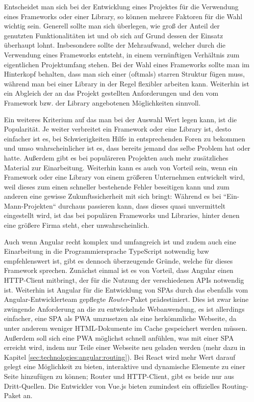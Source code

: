 Entscheidet man sich bei der Entwicklung eines Projektes für die Verwendung eines Frameworks oder einer Library, so können mehrere Faktoren für die Wahl wichtig sein. Generell sollte man sich überlegen, wie groß der Anteil der genutzten Funktionalitäten ist und ob sich auf Grund dessen der Einsatz überhaupt lohnt. Insbesondere sollte der Mehraufwand, welcher durch die Verwendung eines Frameworks entsteht, in einem vernünftigen Verhältnis zum eigentlichen Projektumfang stehen. Bei der Wahl eines Frameworks sollte man im Hinterkopf behalten, dass man sich einer (oftmals) starren Struktur fügen muss, während man bei einer Library in der Regel flexibler arbeiten kann. Weiterhin ist ein Abgleich der an das Projekt gestellten Anforderungen und den vom Framework bzw. der Library angebotenen Möglichkeiten sinnvoll.

Ein weiteres Kriterium auf das man bei der Auswahl Wert legen kann, ist die Popularität. Je weiter verbreitet ein Framework oder eine Library ist, desto einfacher ist es, bei Schwierigkeiten Hilfe in entsprechenden Foren zu bekommen und umso wahrscheinlicher ist es, dass bereits jemand das selbe Problem hat oder hatte. Außerdem gibt es bei populäreren Projekten auch mehr zusätzliches Material zur Einarbeitung. Weiterhin kann es auch von Vorteil sein, wenn ein Framework oder eine Library von einem größeren Unternehmen entwickelt wird, weil dieses zum einen schneller bestehende Fehler beseitigen kann und zum anderen eine gewisse Zukunftssicherheit mit sich bringt: Während es bei ``Ein-Mann-Projekten`` durchaus passieren kann, dass dieses quasi unvermittelt eingestellt wird, ist das bei populären Frameworks und Libraries, hinter denen eine größere Firma steht, eher unwahrscheinlich.

Auch wenn Angular recht komplex und umfangreich ist und zudem auch eine Einarbeitung in die Programmiersprache TypeScript notwendig bzw empfehlenswert ist, gibt es dennoch überzeugende Gründe, welche für dieses Framework sprechen. Zunächst einmal ist es von Vorteil, dass Angular einen \acs{HTTP}-Client mitbringt, der für die Nutzung der verschiedenen \acsp{API} notwendig ist. Weiterhin ist Angular für die Entwicklung von \acsp{SPA} durch das ebenfalls vom Angular-Entwicklerteam gepflegte \textit{Router}-Paket prädestiniert. Dies ist zwar keine zwingende Anforderung an die zu entwickelnde Webanwendung, es ist allerdings einfacher, eine \acl{SPA} als \acl{PWA} umzusetzen als eine herkömmliche Webseite, da unter anderem weniger HTML-Dokumente im Cache gespeichert werden müssen. Außerdem soll sich eine \acs{PWA} möglichst schnell anfühlen, was mit einer \acs{SPA} erreicht wird, indem nur Teile einer Webseite neu geladen werden (mehr dazu in Kapitel \ref{sec:technologies:angular:routing}). Bei React wird mehr Wert darauf gelegt eine Möglichkeit zu bieten, interaktive und dynamische Elemente zu einer Seite hinzufügen zu können; Router und HTTP-Client,  gibt es beide nur aus Dritt-Quellen. Die Entwickler von Vue.js bieten zumindest ein offizielles Routing-Paket an.

